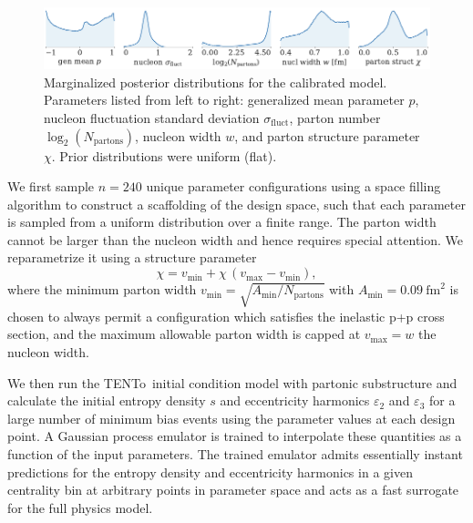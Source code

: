 \documentclass[3p,times,procedia]{elsarticle}
\newcommand{\trento}{T\raisebox{-0.3ex}{R}ENTo}
\newcommand{\e}{\varepsilon}
\begin{document}
\begin{figure}
  \includegraphics{posterior}
  \caption{
    \label{fig:posterior} Marginalized posterior distributions for the calibrated model.
    Parameters listed from left to right: generalized mean parameter $p$, nucleon fluctuation standard deviation $\sigma_\mathrm{fluct}$, parton number $\log_2(N_\mathrm{partons})$, nucleon width $w$, and parton structure parameter $\chi$.
    Prior distributions were uniform (flat).
  }
\end{figure}

We first sample $n=240$ unique parameter configurations using a space filling algorithm to construct a scaffolding of the design space, such that each parameter is sampled from a uniform distribution over a finite range.
The parton width cannot be larger than the nucleon width and hence requires special attention.
We reparametrize it using a structure parameter 
\begin{equation}
  \chi = v_\mathrm{min} + \chi\, (v_\mathrm{max} - v_\mathrm{min}), 
\end{equation}
where the minimum parton width $v_\mathrm{min}=\sqrt{A_\mathrm{min}/N_\mathrm{partons}}$ with $A_\mathrm{min}=0.09 ~\mathrm{fm}^2$ is chosen to always permit a configuration which satisfies the inelastic p+p cross section, and the maximum allowable parton width is capped at $v_\mathrm{max} = w$ the nucleon width.

We then run the \trento\ initial condition model with partonic substructure and calculate the initial entropy density $s$ and eccentricity harmonics $\e_2$ and $\e_3$ for a large number of minimum bias events using the parameter values at each design point.
A Gaussian process emulator is trained to interpolate these quantities as a function of the input parameters.
The trained emulator admits essentially instant predictions for the entropy density  and eccentricity harmonics in a given centrality bin at arbitrary points in parameter space and acts as a fast surrogate for the full physics model.
\end{document}
